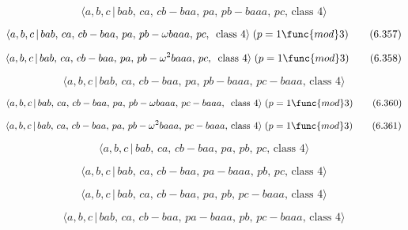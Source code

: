 \documentclass[10pt]{article}
\begin{document}
\begin{equation}
\langle a,b,c\,|\,bab,\,ca,\,cb-baa,\,pa,\,pb-baaa,\,pc,\,\text{class }%
4\rangle  \tag{6.356}
\end{equation}

\begin{equation}
\langle a,b,c\,|\,bab,\,ca,\,cb-baa,\,pa,\,pb-\omega baaa,\,pc,\,\text{
class }4\rangle\;(p=1 \func{mod} 3)  \tag{6.357}
\end{equation}

\begin{equation}
\langle a,b,c\,|\,bab,\,ca,\,cb-baa,\,pa,\,pb-\omega ^2baaa,\,pc,\,\text{
class }4\rangle\;(p=1 \func{mod} 3)  \tag{6.358}
\end{equation}

\begin{equation}
\langle a,b,c\,|\,bab,\,ca,\,cb-baa,\,pa,\,pb-baaa,\,pc-baaa,\,\text{class }%
4\rangle  \tag{6.359}
\end{equation}

\begin{equation}
\langle a,b,c\,|\,bab,\,ca,\,cb-baa,\,pa,\,pb-\omega baaa,\,pc-baaa,\,\text{
class }4\rangle\;(p=1 \func{mod} 3)  \tag{6.360}
\end{equation}

\begin{equation}
\langle a,b,c\,|\,bab,\,ca,\,cb-baa,\,pa,\,pb-\omega ^2baaa,\,pc-baaa,\,%
\text{class }4\rangle\;(p=1 \func{mod} 3)  \tag{6.361}
\end{equation}

\begin{equation}
\langle a,b,c\,|\,bab,\,ca,\,cb-baa,\,pa,\,pb,\,pc,\,\text{class }4\rangle 
\tag{6.362}
\end{equation}

\begin{equation}
\langle a,b,c\,|\,bab,\,ca,\,cb-baa,\,pa-baaa,\,pb,\,pc,\,\text{class }%
4\rangle  \tag{6.363}
\end{equation}

\begin{equation}
\langle a,b,c\,|\,bab,\,ca,\,cb-baa,\,pa,\,pb,\,pc-baaa,\,\text{class }%
4\rangle  \tag{6.364}
\end{equation}

\begin{equation}
\langle a,b,c\,|\,bab,\,ca,\,cb-baa,\,pa-baaa,\,pb,\,pc-baaa,\,\text{class }%
4\rangle  \tag{6.365}
\end{equation}
\end{document}
